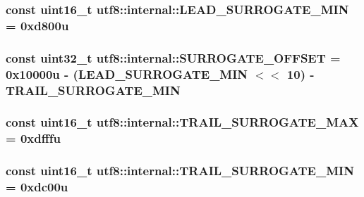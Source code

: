 \subsubsection[{L\+E\+A\+D\+\_\+\+S\+U\+R\+R\+O\+G\+A\+T\+E\+\_\+\+M\+IN}]{\setlength{\rightskip}{0pt plus 5cm}const {\bf uint16\+\_\+t} utf8\+::internal\+::\+L\+E\+A\+D\+\_\+\+S\+U\+R\+R\+O\+G\+A\+T\+E\+\_\+\+M\+IN = 0xd800u}\hypertarget{namespaceutf8_1_1internal_aca9d84aa3b40e635b086c9ce843cc4a4}{}\label{namespaceutf8_1_1internal_aca9d84aa3b40e635b086c9ce843cc4a4}
\subsubsection[{S\+U\+R\+R\+O\+G\+A\+T\+E\+\_\+\+O\+F\+F\+S\+ET}]{\setlength{\rightskip}{0pt plus 5cm}const {\bf uint32\+\_\+t} utf8\+::internal\+::\+S\+U\+R\+R\+O\+G\+A\+T\+E\+\_\+\+O\+F\+F\+S\+ET = 0x10000u -\/ (\+L\+E\+A\+D\+\_\+\+S\+U\+R\+R\+O\+G\+A\+T\+E\+\_\+\+M\+I\+N $<$$<$ 10) -\/ T\+R\+A\+I\+L\+\_\+\+S\+U\+R\+R\+O\+G\+A\+T\+E\+\_\+\+M\+IN}\hypertarget{namespaceutf8_1_1internal_a31ff17e602e8e7e15db5ebfb5e93a3fb}{}\label{namespaceutf8_1_1internal_a31ff17e602e8e7e15db5ebfb5e93a3fb}
\subsubsection[{T\+R\+A\+I\+L\+\_\+\+S\+U\+R\+R\+O\+G\+A\+T\+E\+\_\+\+M\+AX}]{\setlength{\rightskip}{0pt plus 5cm}const {\bf uint16\+\_\+t} utf8\+::internal\+::\+T\+R\+A\+I\+L\+\_\+\+S\+U\+R\+R\+O\+G\+A\+T\+E\+\_\+\+M\+AX = 0xdfffu}\hypertarget{namespaceutf8_1_1internal_a37212482f99986fc6aeaa95a9079c972}{}\label{namespaceutf8_1_1internal_a37212482f99986fc6aeaa95a9079c972}
\subsubsection[{T\+R\+A\+I\+L\+\_\+\+S\+U\+R\+R\+O\+G\+A\+T\+E\+\_\+\+M\+IN}]{\setlength{\rightskip}{0pt plus 5cm}const {\bf uint16\+\_\+t} utf8\+::internal\+::\+T\+R\+A\+I\+L\+\_\+\+S\+U\+R\+R\+O\+G\+A\+T\+E\+\_\+\+M\+IN = 0xdc00u}\hypertarget{namespaceutf8_1_1internal_a836088cf3e5e29ac9a89b2ffbd91623e}{}\label{namespaceutf8_1_1internal_a836088cf3e5e29ac9a89b2ffbd91623e}
